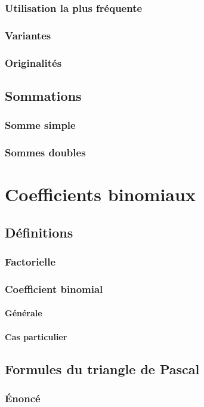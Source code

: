 \documentclass[12pt,a4paper,french]{book}
\begin{document}
		\subsection{Utilisation la plus fréquente}
		\subsection{Variantes}
		\subsection{Originalités}
	\section{Sommations}
		\subsection{Somme simple}
		\subsection{Sommes doubles}
		
\chapter{Coefficients binomiaux}
	\section{Définitions}
		\subsection{Factorielle}
		\subsection{Coefficient binomial}
			\subsubsection{Générale}
			\subsubsection{Cas particulier}
	\section{Formules du triangle de Pascal}
		\subsection{Énoncé}
\end{document}
